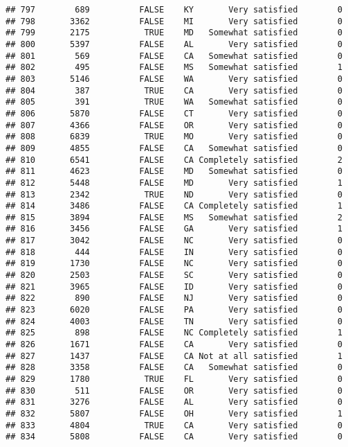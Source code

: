 \documentclass[]{book}
\theoremstyle{definition}
\theoremstyle{definition}
\theoremstyle{remark}
\begin{document}
\begin{verbatim}
## 797        689          FALSE    KY       Very satisfied        0
## 798       3362          FALSE    MI       Very satisfied        0
## 799       2175           TRUE    MD   Somewhat satisfied        0
## 800       5397          FALSE    AL       Very satisfied        0
## 801        569          FALSE    CA   Somewhat satisfied        0
## 802        495          FALSE    MS   Somewhat satisfied        1
## 803       5146          FALSE    WA       Very satisfied        0
## 804        387           TRUE    CA       Very satisfied        0
## 805        391           TRUE    WA   Somewhat satisfied        0
## 806       5870          FALSE    CT       Very satisfied        0
## 807       4366          FALSE    OR       Very satisfied        0
## 808       6839           TRUE    MO       Very satisfied        0
## 809       4855          FALSE    CA   Somewhat satisfied        0
## 810       6541          FALSE    CA Completely satisfied        2
## 811       4623          FALSE    MD   Somewhat satisfied        0
## 812       5448          FALSE    MD       Very satisfied        1
## 813       2342           TRUE    ND       Very satisfied        0
## 814       3486          FALSE    CA Completely satisfied        1
## 815       3894          FALSE    MS   Somewhat satisfied        2
## 816       3456          FALSE    GA       Very satisfied        1
## 817       3042          FALSE    NC       Very satisfied        0
## 818        444          FALSE    IN       Very satisfied        0
## 819       1730          FALSE    NC       Very satisfied        0
## 820       2503          FALSE    SC       Very satisfied        0
## 821       3965          FALSE    ID       Very satisfied        0
## 822        890          FALSE    NJ       Very satisfied        0
## 823       6020          FALSE    PA       Very satisfied        0
## 824       4003          FALSE    TN       Very satisfied        0
## 825        898          FALSE    NC Completely satisfied        1
## 826       1671          FALSE    CA       Very satisfied        0
## 827       1437          FALSE    CA Not at all satisfied        1
## 828       3358          FALSE    CA   Somewhat satisfied        0
## 829       1780           TRUE    FL       Very satisfied        0
## 830        511          FALSE    OR       Very satisfied        0
## 831       3276          FALSE    AL       Very satisfied        0
## 832       5807          FALSE    OH       Very satisfied        1
## 833       4804           TRUE    CA       Very satisfied        0
## 834       5808          FALSE    CA       Very satisfied        0

\end{verbatim}
\end{document}

